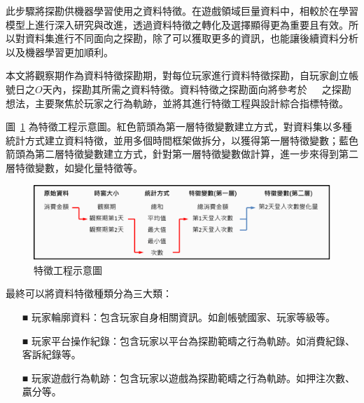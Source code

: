 此步驟將探勘供機器學習使用之資料特徵。在遊戲領域巨量資料中，相較於在學習模型上進行深入研究與改進，透過資料特徵之轉化及選擇顯得更為重要且有效。所以對資料集進行不同面向之探勘，除了可以獲取更多的資訊，也能讓後續資料分析以及機器學習更加順利。

本文將觀察期作為資料特徵探勘期，對每位玩家進行資料特徵探勘，自玩家創立帳號日之$O$天內，探勘其所需之資料特徵。資料特徵之探勘面向將參考於~\cite{sifa2015predicting}~\cite{lee2016predicting}~\cite{martinez2020machine}之探勘想法，主要聚焦於玩家之行為軌跡，並將其進行特徵工程與設計綜合指標特徵。

圖~\ref{fig:Image_FeatureEngineering} 為特徵工程示意圖。紅色箭頭為第一層特徵變數建立方式，對資料集以多種統計方式建立資料特徵，並用多個時間框架做拆分，以獲得第一層特徵變數；藍色箭頭為第二層特徵變數建立方式，針對第一層特徵變數做計算，進一步來得到第二層特徵變數，如變化量特徵等。

\begin{figure}[!htb]
  \begin{center}
    \includegraphics[width=1\textwidth]{figures/Image_FeatureEngineering.png}
    \caption[特徵工程示意圖]{特徵工程示意圖}
    \label{fig:Image_FeatureEngineering}
  \end{center}
\end{figure}

最終可以將資料特徵種類分為三大類：

\begin{itemize}
  \item[■] 玩家輪廓資料：包含玩家自身相關資訊。如創帳號國家、玩家等級等。
  \item[■] 玩家平台操作紀錄：包含玩家以平台為探勘範疇之行為軌跡。如消費紀錄、客訴紀錄等。
  \item[■] 玩家遊戲行為軌跡：包含玩家以遊戲為探勘範疇之行為軌跡。如押注次數、贏分等。
\end{itemize}


